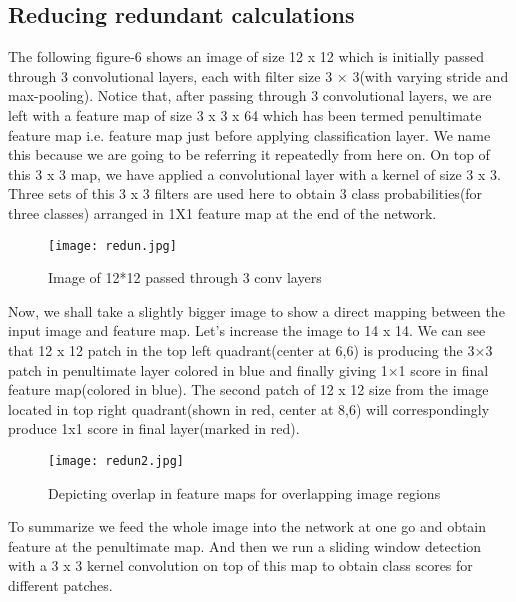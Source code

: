 	\subsection{Reducing redundant calculations}
		The following figure-6 shows an image of size 12 x 12 which is initially passed through 3 convolutional layers, each with filter size 3 × 3(with varying stride and max-pooling). Notice that, after passing through 3 convolutional layers, we are left with a feature map of size 3 x 3 x 64 which has been termed penultimate feature map i.e. feature map just before applying classification layer. We name this because we are going to be referring it repeatedly from here on. On top of this 3 x 3 map, we have applied a convolutional layer with a kernel of size 3 x 3. Three sets of this 3 x 3 filters are used here to obtain 3 class probabilities(for three classes) arranged in 1X1 feature map at the end of the network.
		
		\begin{figure}[htbp]
			\centering
			\texttt{[image: redun.jpg]}
			\caption{Image of 12*12 passed through 3 conv layers\label{Image of 12*12 passed through 3 conv layers}}
		\end{figure}
	
		Now, we shall take a slightly bigger image to show a direct mapping between the input image and feature map. Let’s increase the image to 14 x 14. We can see that 12 x 12 patch in the top left quadrant(center at 6,6) is producing the 3×3 patch in penultimate layer colored in blue and finally giving 1×1 score in final feature map(colored in blue). The second patch of 12 x 12 size from the image located in top right quadrant(shown in red, center at 8,6) will correspondingly produce 1x1 score in final layer(marked in red).
		\begin{figure}[htbp]
			\centering
			\texttt{[image: redun2.jpg]}
			\caption{Depicting overlap in feature maps for overlapping image regions\label{Depicting overlap in feature maps for overlapping image regions}}
		\end{figure}
		
		To summarize we feed the whole image into the network at one go and obtain feature at the penultimate map. And then we run a sliding window detection with a 3 x 3 kernel convolution on top of this map to obtain class scores for different patches.
		
